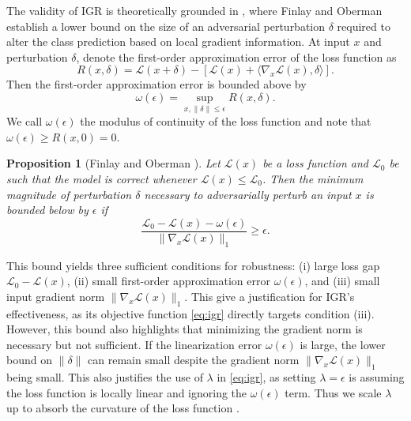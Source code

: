 \documentclass{article}
\newtheorem{proposition}[theorem]{Proposition}
\begin{document}
The validity of IGR is theoretically grounded in \cite{finlay2019scaleableinputgradientregularization}, where Finlay and Oberman establish a lower bound on the size of an adversarial perturbation $\delta$ required to alter the class prediction based on local gradient information. At input $x$ and perturbation $\delta$, denote the first-order approximation error of the loss function as
\begin{equation}
  R(x, \delta) = \mathcal{L}(x + \delta) - [\mathcal{L}(x) + \langle \nabla_x \mathcal{L}(x), \delta \rangle].
  \label{eq:remainder}
\end{equation}
Then the first-order approximation error is bounded above by
\[
  \omega(\epsilon) = \sup_{x, \|\delta\| \leq \epsilon} R(x, \delta).
\]
We call $\omega(\epsilon)$ the modulus of continuity of the loss function and note that $\omega(\epsilon) \geq R(x, 0) = 0$.

\begin{proposition}[Finlay and Oberman \cite{finlay2019scaleableinputgradientregularization}]
  Let $\mathcal{L}(x)$ be a loss function and $\mathcal{L}_0$ be such that the model is correct whenever $\mathcal{L}(x) \leq \mathcal{L}_0$. Then the minimum magnitude of perturbation $\delta$ necessary to adversarially perturb an input $x$ is bounded below by $\epsilon$ if
  \begin{equation}
    \frac{\mathcal{L}_0 - \mathcal{L}(x) - \omega(\epsilon)}{\|\nabla_x \mathcal{L}(x)\|_1} \geq \epsilon. \label{eq:finlay_bound}
  \end{equation}
\end{proposition}
This bound yields three sufficient conditions for robustness: (i) large loss gap $\mathcal{L}_0 - \mathcal{L}(x)$, (ii) small first-order approximation error $\omega(\epsilon)$, and (iii) small input gradient norm $\|\nabla_x \mathcal{L}(x)\|_1$. This give a justification for IGR's effectiveness, as its objective function \eqref{eq:igr} directly targets condition (iii). However, this bound also highlights that minimizing the gradient norm is necessary but not sufficient. If the linearization error $\omega(\epsilon)$ is large, the lower bound on $\|\delta\|$ can remain small despite the gradient norm $\|\nabla_x \mathcal{L}(x)\|_1$ being small. This also justifies the use of $\lambda$ in \eqref{eq:igr}, as setting $\lambda = \epsilon$  is assuming the loss function is locally linear and ignoring the $\omega(\epsilon)$ term. Thus we scale $\lambda$ up to absorb the curvature of the loss function \cite{finlay2019scaleableinputgradientregularization}.
\end{document}
